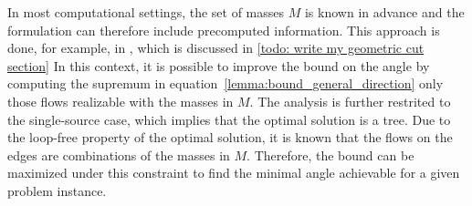 \documentclass[12pt,a4paper]{article}
\numberwithin{equation}{section}
\theoremstyle{mytheorem}
\theoremstyle{myremark}
\theoremstyle{myparagraph}
\begin{document}
    In most computational settings, the set of masses $M$ is known in advance and the formulation can therefore include 
    precomputed information. This approach is done, for example, in \cite[Eq (50)]{pinto2020new}, which is discussed in \ref{todo: write my geometric cut section}
    In this context, it is possible to improve the bound on the angle by 
    computing the supremum in equation~\ref{lemma:bound_general_direction} only those flows realizable with the masses in $M$.
    The analysis is further restrited to the single-source case, which implies that  the optimal solution is a tree.
    Due to the loop-free property of the optimal solution, it is known that the flows on the edges are combinations
    of the masses in $M$.     
    Therefore, the bound can be maximized under this constraint to find the minimal angle achievable 
    for a given problem instance.
\end{document}
